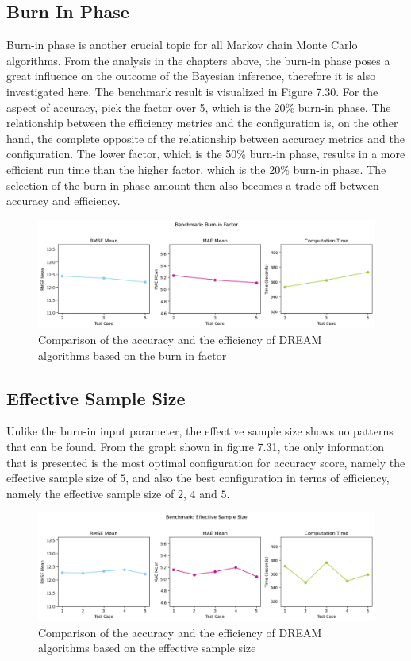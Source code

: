 \subsection{Burn In Phase}
Burn-in phase is another crucial topic for all Markov chain Monte Carlo algorithms. From the analysis in the chapters above, the burn-in phase poses a great influence on the outcome of the Bayesian inference, therefore it is also investigated here. The benchmark result is visualized in Figure 7.30. For the aspect of accuracy, pick the factor over 5, which is the 20\% burn-in phase. The relationship between the efficiency metrics and the configuration is, on the other hand, the complete opposite of the relationship between accuracy metrics and the configuration. The lower factor, which is the 50\% burn-in phase, results in a more efficient run time than the higher factor, which is the 20\% burn-in phase. The selection of the burn-in phase amount then also becomes a trade-off between accuracy and efficiency.
\begin{figure}[H]
    \centering
    \includegraphics[width=1\textwidth]{figures/dream/burn_in.png}
    \captionsetup{width=.8\textwidth}
    \caption{Comparison of the accuracy and the efficiency of DREAM algorithms based on the burn in factor}
    \label{fig:enter-label}
\end{figure}

\subsection{Effective Sample Size}
Unlike the burn-in input parameter, the effective sample size shows no patterns that can be found. From the graph shown in figure 7.31, the only information that is presented is the most optimal configuration for accuracy score, namely the effective sample size of $5$, and also the best configuration in terms of efficiency, namely the effective sample size of $2$, $4$ and $5$.
\begin{figure}[H]
    \centering
    \includegraphics[width=1\textwidth]{figures/dream/ess.png}
    \captionsetup{width=.8\textwidth}
    \caption{Comparison of the accuracy and the efficiency of DREAM algorithms based on the effective sample size}
    \label{fig:enter-label}
\end{figure}
